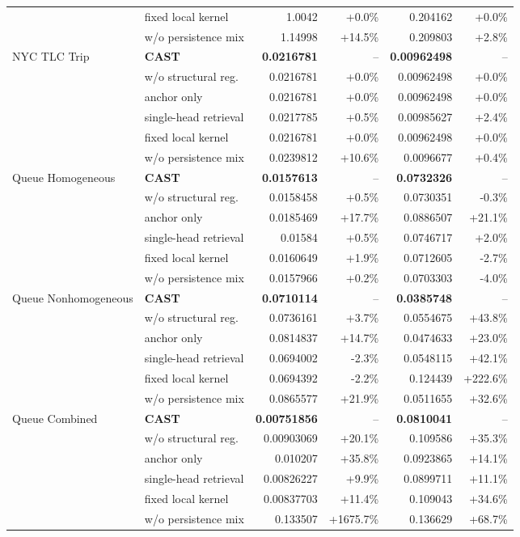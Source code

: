 \begin{longtable}{@{}llrrrr@{}}
 & fixed local kernel & 1.0042 & +0.0\% & 0.204162 & +0.0\% \\
 & w/o persistence mix & 1.14998 & +14.5\% & 0.209803 & +2.8\% \\
\addlinespace
NYC TLC Trip & \textbf{CAST} & \textbf{0.0216781} & -- & \textbf{0.00962498} & -- \\
 & w/o structural reg. & 0.0216781 & +0.0\% & 0.00962498 & +0.0\% \\
 & anchor only & 0.0216781 & +0.0\% & 0.00962498 & +0.0\% \\
 & single-head retrieval & 0.0217785 & +0.5\% & 0.00985627 & +2.4\% \\
 & fixed local kernel & 0.0216781 & +0.0\% & 0.00962498 & +0.0\% \\
 & w/o persistence mix & 0.0239812 & +10.6\% & 0.0096677 & +0.4\% \\
\addlinespace
Queue Homogeneous & \textbf{CAST} & \textbf{0.0157613} & -- & \textbf{0.0732326} & -- \\
 & w/o structural reg. & 0.0158458 & +0.5\% & 0.0730351 & -0.3\% \\
 & anchor only & 0.0185469 & +17.7\% & 0.0886507 & +21.1\% \\
 & single-head retrieval & 0.01584 & +0.5\% & 0.0746717 & +2.0\% \\
 & fixed local kernel & 0.0160649 & +1.9\% & 0.0712605 & -2.7\% \\
 & w/o persistence mix & 0.0157966 & +0.2\% & 0.0703303 & -4.0\% \\
\addlinespace
Queue Nonhomogeneous & \textbf{CAST} & \textbf{0.0710114} & -- & \textbf{0.0385748} & -- \\
 & w/o structural reg. & 0.0736161 & +3.7\% & 0.0554675 & +43.8\% \\
 & anchor only & 0.0814837 & +14.7\% & 0.0474633 & +23.0\% \\
 & single-head retrieval & 0.0694002 & -2.3\% & 0.0548115 & +42.1\% \\
 & fixed local kernel & 0.0694392 & -2.2\% & 0.124439 & +222.6\% \\
 & w/o persistence mix & 0.0865577 & +21.9\% & 0.0511655 & +32.6\% \\
\addlinespace
Queue Combined & \textbf{CAST} & \textbf{0.00751856} & -- & \textbf{0.0810041} & -- \\
 & w/o structural reg. & 0.00903069 & +20.1\% & 0.109586 & +35.3\% \\
 & anchor only & 0.010207 & +35.8\% & 0.0923865 & +14.1\% \\
 & single-head retrieval & 0.00826227 & +9.9\% & 0.0899711 & +11.1\% \\
 & fixed local kernel & 0.00837703 & +11.4\% & 0.109043 & +34.6\% \\
 & w/o persistence mix & 0.133507 & +1675.7\% & 0.136629 & +68.7\% \\
\bottomrule
\end{longtable}
\endgroup
